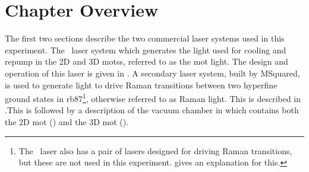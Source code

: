 \section{Chapter Overview}\label{sec:setup_overview}
The first two sections describe the two commercial laser systems used in this experiment. The \Muquans\ laser system which generates the light used for cooling and repump in the 2D and 3D \acp{mots}, referred to as the \acs{mot} light. The design and operation of this laser is given in . A secondary laser system, built by MSquared, is used to generate light to drive Raman transitions between two hyperfine ground states in \ac{rb87}\footnote{The \Muquans\ laser also has a pair of lasers designed for driving Raman transitions, but these are not used in this experiment.  gives an explanation for this.}, otherwise referred to as Raman light. This is described in .This is followed by a description of the vacuum chamber in  which contains both the 2D \ac{mot} () and the 3D \ac{mot} ().  

